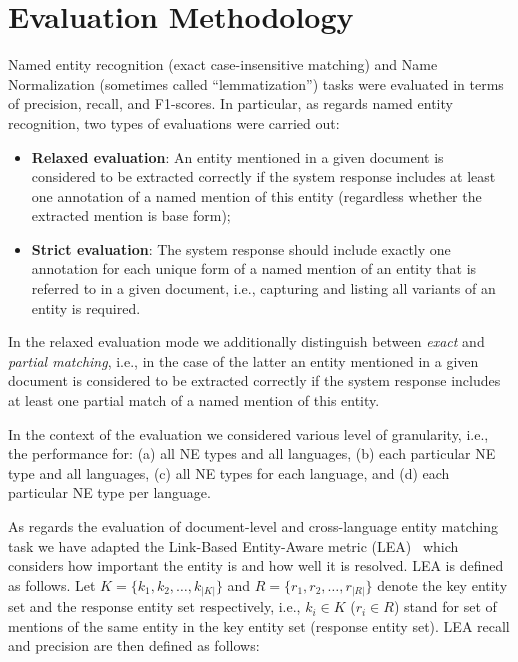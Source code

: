\documentclass[11pt]{article}
\begin{document}
\section{Evaluation Methodology}
\label{sec:evaluation}

Named entity recognition (exact case-insensitive matching) and  Name Normalization (sometimes called “lemmatization”) tasks were evaluated in terms of precision, recall, and F1-scores. In particular, as regards named entity recognition, two types of evaluations were carried out:

\begin{itemize}

\item \textbf{Relaxed evaluation}: An entity mentioned in a given document is considered to be extracted correctly if the system response includes at least one annotation of a named mention of this entity (regardless whether the extracted mention is base form);

\item \textbf{Strict evaluation}: The system response should include exactly one annotation for each unique form of a named mention of an entity that is referred to in a given document, i.e., capturing and listing all variants of an entity is required.

\end{itemize}

\noindent In the relaxed evaluation mode we additionally distinguish between \textit{exact} and \textit{partial matching}, i.e., in the case of the latter an entity mentioned in a given document is considered to be extracted correctly if the system response includes at least one partial match of a named mention of this entity.

In the context of the evaluation we considered various level of granularity, i.e., the performance for: 
(a) all NE types and all languages, (b) each particular NE type and all languages, (c) all NE types for 
each language, and (d) each particular NE type per language. 

As regards the evaluation of document-level and cross-language entity matching task we have adapted the 
Link-Based Entity-Aware metric (LEA)~\cite{DBLP:conf-acl-Moosavi016} which considers how important the entity is and how well it is resolved. LEA is defined as follows. Let $K = \{k_1,k_2,\ldots,k_{|K|} \}$ and $R = \{r_1,r_2,\ldots,r_{|R|} \}$ denote the key entity set and the response entity set respectively, i.e., $k_i \in K$ ($r_i \in R$) stand for set of mentions
of the same entity in the key entity set (response entity set). LEA recall and precision are then defined as follows:
\end{document}
